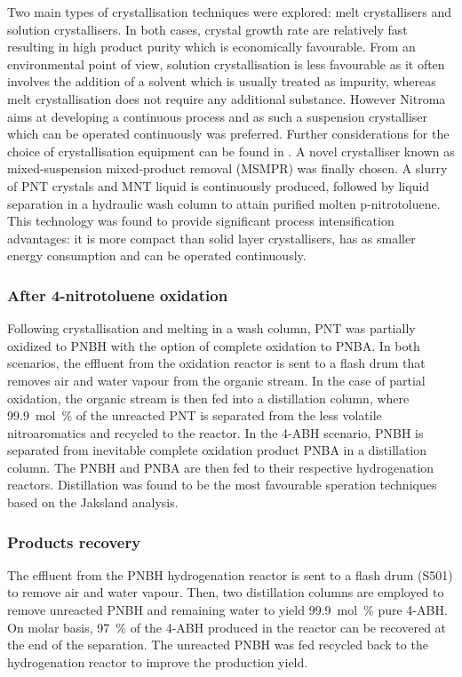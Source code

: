 Two main types of crystallisation techniques were explored: melt crystallisers and solution crystallisers. In both cases, crystal growth rate are relatively fast resulting in high product purity which is economically favourable. From an environmental point of view, solution crystallisation is less favourable as it often involves the addition of a solvent which is usually treated as impurity, whereas melt crystallisation does not require any additional substance. However Nitroma aims at developing a continuous process and as such a suspension crystalliser which can be operated continuously was preferred. Further considerations for the choice of crystallisation equipment can be found in . A novel crystalliser known as mixed-suspension mixed-product removal (MSMPR) was finally chosen. A slurry of PNT crystals and MNT liquid is continuously produced, followed by liquid separation in a hydraulic wash column to attain purified molten p-nitrotoluene. This technology was found to provide significant process intensification advantages: it is more compact than solid layer crystallisers, has as smaller energy consumption and can be operated continuously.

\subsubsection{After 4-nitrotoluene oxidation}

Following crystallisation and melting in a wash column, PNT was partially oxidized to PNBH with the option of complete oxidation to PNBA. In both scenarios, the effluent from the oxidation reactor is sent to a flash drum that removes air and water vapour from the organic stream. In the case of partial oxidation, the organic stream is then fed into a distillation column, where \SI{99.9}{mol\percent} of the unreacted PNT is separated from the less volatile nitroaromatics and recycled to the reactor. 
In the 4-ABH scenario, PNBH is separated from inevitable complete oxidation product PNBA in a distillation column. The PNBH and PNBA are then fed to their respective hydrogenation reactors. Distillation was found to be the most favourable speration techniques based on the Jaksland analysis.


\subsubsection{Products recovery}

The effluent from the PNBH hydrogenation reactor is sent to a flash drum (S501) to remove air and water vapour. Then, two distillation columns are employed to remove unreacted PNBH and remaining water to yield  \SI{99.9}{mol\percent} pure 4-ABH. On molar basis, \SI{97}{\percent} of the 4-ABH produced in the reactor can be recovered at the end of the separation. The unreacted  PNBH was fed recycled back to the hydrogenation reactor to improve the production yield.

